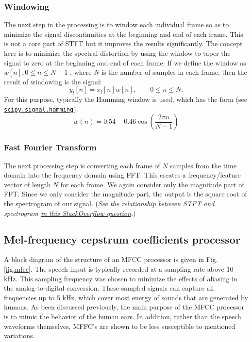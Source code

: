 \documentclass{article}
\begin{document}
\subsubsection{Windowing}
The next step in the processing is to window each individual frame so as to minimize the signal discontinuities at the beginning and end of each frame. This is not a core part of STFT but it improves the results significantly. The concept here is to minimize the spectral distortion by using the window to taper the signal to zero at the beginning and end of each frame.  If we define the window as $w[n], 0\leq n\leq N-1$ , where $N$ is the number of samples in each frame, then the result of windowing is the signal:
\begin{equation}
    y_l[n] =x_l[n]w[n], \qquad 0\leq n \leq N.
\end{equation}
For this purpose, typically the Hamming window is used, which has the form (see \href{https://docs.scipy.org/doc/scipy-0.19.1/reference/generated/scipy.signal.hamming.html}{\texttt{scipy.signal.hamming}}):
\begin{equation}
    w(n) = 0.54 - 0.46 \cos\left(\frac{2\pi n}{N-1}\right)
\end{equation}

\subsubsection{Fast Fourier Transform}
The next processing step is converting each frame of $N$ samples from the time domain into the frequency domain using FFT. This creates a frequency/feature vector of length $N$ for each frame. We again consider only the magnitude part of FFT. Since we only consider the magnitude part, the output is the square root of the spectrogram of our signal. ({\it See the relationship between STFT and spectrogram \href{https://stackoverflow.com/questions/55683936/what-is-the-difference-between-scipy-signal-spectrogram-and-scipy-signal-stft}{in this StackOverflow question}.})

\subsection{Mel-frequency cepstrum coefficients processor}
A block diagram of the structure of an MFCC processor is given in Fig. \ref{fig:mfcc}. The speech input is typically recorded at a sampling rate above 10 kHz.  This sampling frequency was chosen to minimize the effects of aliasing in the analog-to-digital conversion.  These sampled signals can capture all frequencies up to 5 kHz, which cover most energy of sounds that are generated by humans.  As been discussed previously, the main purpose of the MFCC processor is to mimic the behavior of the human ears.  In addition, rather than the speech waveforms themselves, MFFC's are shown to be less susceptible to mentioned variations.
\end{document}
